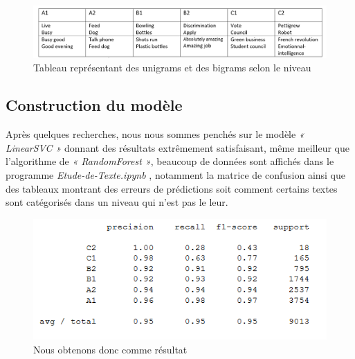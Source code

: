 \documentclass[11pt]{article}
\begin{document}
\begin{figure}[!htb]
  \centering
    \caption{Tableau représentant des unigrams et des bigrams selon le niveau}
    \includegraphics[width=\textwidth]{texttab.png}
\end{figure}

\subsection {Construction du modèle}

Après quelques recherches, nous nous sommes penchés sur le modèle \textit{« LinearSVC »} donnant des résultats extrêmement satisfaisant, même meilleur que l’algorithme de \textit{« RandomForest »}, beaucoup de données sont affichés dans le programme \textit{Etude-de-Texte.ipynb }, notamment la matrice de confusion ainsi que des tableaux montrant des erreurs de prédictions soit comment certains textes sont catégorisés dans un niveau qui n’est pas le leur. \newline
\begin{figure}[!htb]
  \centering
    \caption{Nous obtenons donc comme résultat }
	\includegraphics[width=0.9\columnwidth]{textresults.png}
\end{figure}

\clearpage
\end{document}
